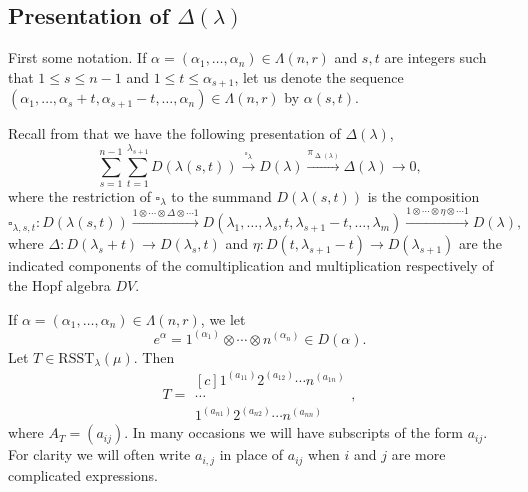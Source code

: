 \documentclass[ALCO,Unicode]{cedram}
\newcommand{\al}{\alpha}
\newcommand{\la}{\lambda}
\newcommand{\La}{\Lambda}
\DeclareMathOperator{\D}{\mathrm{\Delta}}
\numberwithin{equation}{section}
\begin{document}
\subsection{Presentation of \texorpdfstring{$\Delta(\la)$}{Delta(lambda)}}\label{s2.4}
First some notation. If $\al=(\al_1,\dots,\al_n) \in \La(n,r)$ and $s, t$ are integers such that $1 \le s \le n-1$ and $1 \le t \le \al_{s+1} $, let us denote the sequence $(\al_1,\dots,\al_s+t, \al_{s+1}-t,\dots,\al_n) \in \La(n,r)$ by $\al({s,t})$. 

Recall from \cite[Theorem II.3.16]{ABW} that we have the following presentation of $\Delta(\la)$, \begin{equation}\label{pres1}
\sum_{s=1}^{n-1}\sum_{t=1}^{\lambda_{s+1}}D(\la(s,t)) \xrightarrow{\square_{\la}} D(\lambda) \xrightarrow{\pi_{\D(\la)}} \Delta(\lambda) \to 0,\end{equation}
where the restriction of $ \square_{\la} $ to the summand $D(\la(s,t))$ is the composition
\begin{equation}\label{boxmap}
\square_{\la, s,t}:D(\la(s,t)) \xrightarrow{1\otimes\cdots \otimes \Delta \otimes \cdots 1}D(\lambda_1,\dots,\lambda_s,t,\lambda_{s+1}-t,\dots,\lambda_m) \xrightarrow{1\otimes\cdots \otimes \eta \otimes \cdots 1} D(\lambda),
\end{equation}
where $\Delta:D(\lambda_s+t) \to D(\lambda_s,t)$ and $\eta:D(t,\lambda_{s+1}-t) \to D(\lambda_{s+1})$ are the indicated components of the comultiplication and multiplication respectively of the Hopf algebra $DV$. 

If $\al=(\al_1,\dots,\al_n) \in \La(n,r)$, we let \[e^{\al}=1^{(\al_1)} \otimes \cdots \otimes n^{(\al_n)} \in D(\al).\] Let $T \in \mathrm{RSST}_{\la}(\mu)$. Then \[ T=\begin{matrix*}[c]
	1^{(a_{11})}2^{(a_{12})} \cdots n^{(a_{1n})} \\
	\cdots\\
	1^{(a_{n1})} 2^{(a_{n2})}\cdots n^{(a_{nn})}  \end{matrix*}, \]
where $A_T=(a_{ij})$. In many occasions we will have subscripts of the form $a_{ij}$. For clarity we will often write $a_{i,j}$ in place of $a_{ij}$ when $i$ and $j$ are more complicated expressions. 
\end{document}
